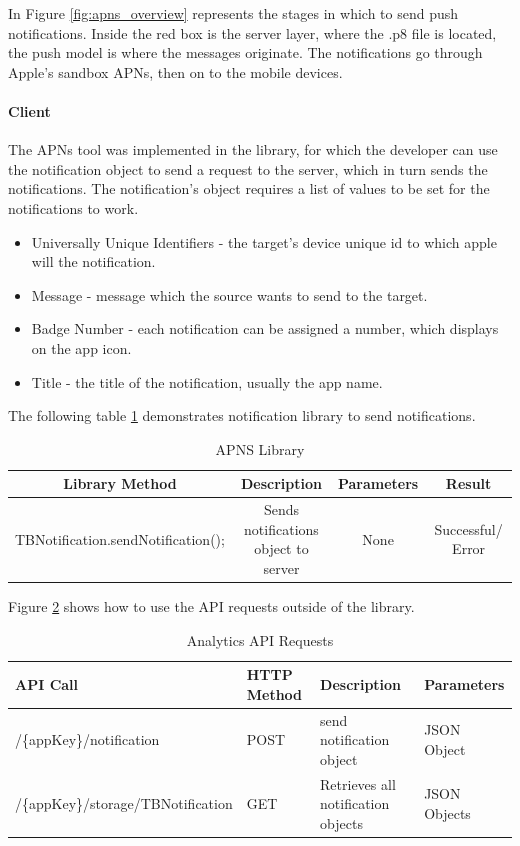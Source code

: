 In Figure \ref{fig:apns_overview} represents the stages in which to send push notifications. Inside the red box is the server layer, where the .p8 file is located, the push model is where the messages originate. The notifications go through Apple's sandbox APNs, then on to the mobile devices.

\paragraph{Client}

The APNs tool was implemented in the library, for which the developer can use the notification object to send a request to the server, which in turn sends the notifications. The notification's object requires a list of values to be set for the notifications to work.

\begin{itemize}
  \item Universally Unique Identifiers
  - the target's device unique id to which apple will the notification.
  \item Message
  - message which the source wants to send to the target.
  \item Badge Number
  - each notification can be assigned a number, which displays on the app icon.
  \item Title
  - the title of the notification, usually the app name.
\end{itemize}

The following table \ref{table:mob_apns} demonstrates notification library to send notifications.

\begin{table}[!h]
\centering
\caption{APNS Library}
\label{table:mob_apns}
\begin{tabular}{|c|c|c|c|}
\hline
\rowcolor{green!20}
Library Method                    & Description                        & Parameters    & Result              \\ 
\hline
TBNotification.sendNotification();        & \makecell{Sends notifications\\ object to server} &  None & Successful/ Error   \\ 
\hline
\end{tabular}%
\end{table}

Figure \ref{table:apns} shows how to use the API requests outside of the library.

\begin{table}[!h]
\centering
\caption{Analytics API Requests}
\label{table:apns}
\begin{tabular}{|l|l|l|l|}
\hline
\rowcolor{green!20}
API Call                        & HTTP Method & Description                    & Parameters   \\ \hline
/\{appKey\}/notification & POST        & send notification object       & JSON Object  \\ \hline
/\{appKey\}/storage/TBNotification & GET         & Retrieves all notification objects & JSON Objects \\ \hline
\end{tabular}
\end{table}



